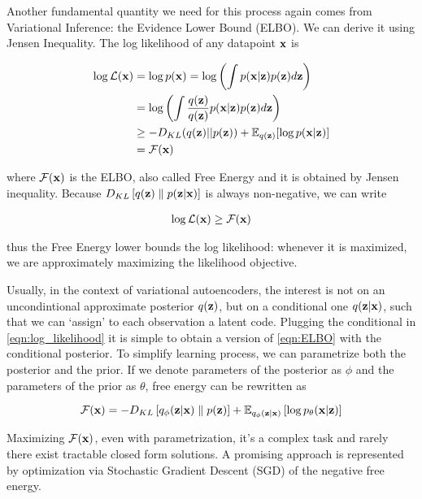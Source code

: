 \documentclass[12pt]{article}
\begin{document}
Another fundamental quantity we need for this process again comes from Variational Inference: the Evidence Lower Bound (ELBO). We can derive it using Jensen Inequality. The log likelihood of any datapoint \(\textbf{x}\) is 

\begin{align}
    \label{eqn:log_likelihood}
    \log \mathcal{L}(\textbf{x}) &= \log p(\textbf{x}) = \log \left( \int p(\textbf{x}|\textbf{z})p(\textbf{z})d\textbf{z} \right) \nonumber \\
    &= \log \left( \int \frac{q (\textbf{z})}{q (\textbf{z})} p(\textbf{x}|\textbf{z})p(\textbf{z})d\textbf{z} \right) \nonumber \\
    &\geq -D_{KL}(q(\textbf{z}) || p(\textbf{z})) + \mathbb{E}_{q(\textbf{z})}[\log p(\textbf{x}|\textbf{z})] \\ &= \mathcal{F}(\textbf{x}) \nonumber
\end{align}

where $\mathcal{F}(\textbf{x})$ is the ELBO, also called Free Energy \cite{pmlr-v32-rezende14} and it is obtained by Jensen inequality.
Because \(D_{KL}\left[ q(\textbf{z}) \parallel p(\textbf{z}|\textbf{x}) \right]\) is always non-negative, we can write

\begin{align}
    \log \mathcal{L}(\textbf{x}) \geq \mathcal{F}(\textbf{x})
\end{align}

thus the Free Energy lower bounds the log likelihood: whenever it is maximized, we are approximately maximizing the likelihood objective.


Usually, in the context of variational autoencoders, the interest is not on an uncondintional approximate posterior \(q(\textbf{z})\), but on a conditional one \(q(\textbf{z}|\textbf{x})\), such that we can `assign' to each observation a latent code. Plugging the conditional in \eqref{eqn:log_likelihood} it is simple to obtain a version of \eqref{eqn:ELBO} with the conditional posterior. To simplify learning process, we can parametrize both the posterior and the prior. If we denote parameters of the posterior as \(\phi\) and the parameters of the prior as \(\theta\), free energy can be rewritten as

\begin{equation}
    \label{eqn:ELBO}
    \mathcal{F}(\textbf{x}) = -D_{KL}\left[ q_{\phi}(\textbf{z}|\textbf{x}) \parallel p(\textbf{z}) \right] + \mathbb{E}_{q_{\phi}(\textbf{z}|\textbf{x})} \left[ \log p_{\theta}(\textbf{x}|\textbf{z}) \right]
\end{equation}

Maximizing \(\mathcal{F}(\textbf{x})\), even with parametrization, it's a complex task and rarely there exist tractable closed form solutions. A promising approach is represented by optimization via Stochastic Gradient Descent (SGD) of the negative free energy.
\end{document}
